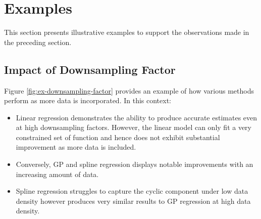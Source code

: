 \section{Examples}
This section presents illustrative examples to support the observations made in
the preceding section.


\subsection{Impact of Downsampling Factor}


Figure \ref{fig:ex-downsampling-factor} provides an example of how various
methods perform as more data is incorporated. In this context:

\begin{itemize}
    \item Linear regression demonstrates the ability to produce accurate estimates even
    at high downsampling factors. However, the linear model can only
    fit a very constrained set of function and hence
    does not exhibit substantial improvement as more data is included.
    \item Conversely, GP and spline regression displays notable improvements with an
    increasing amount of data.
    \item Spline regression struggles to capture the cyclic
    component under low data density however produces very similar results
    to GP regression at high data density.
\end{itemize}

